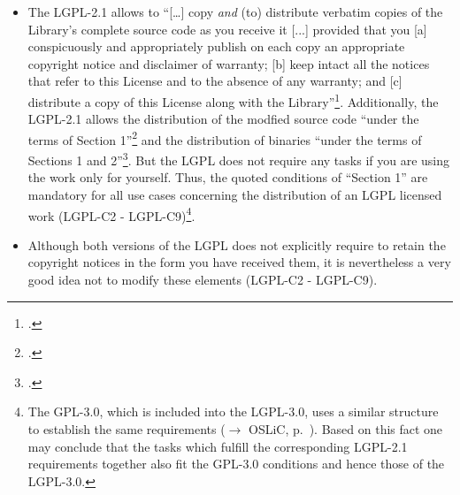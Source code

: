 \begin{itemize}
  
  \item The LGPL-2.1 allows to \enquote{[\ldots] copy \emph{and} (to)
  distribute verbatim copies of the Library's complete source code as you
  receive it [...] provided that you [a] conspicuously and appropriately publish
  on each copy an appropriate copyright notice and disclaimer of warranty; [b]
  keep intact all the notices that refer to this License and to the absence of
  any warranty; and [c] distribute a copy of this License along with the
  Library}\footcite[cf.][\nopage wp.\ §1, emphasizes by
  KR]{Lgpl21OsiLicense1999a}. Additionally, the LGPL-2.1 allows the distribution
  of the modfied source code \enquote{under the terms of Section
  1}\footcite[cf.][\nopage wp.\ §2]{Lgpl21OsiLicense1999a} and the distribution
  of binaries \enquote{under the terms of Sections 1 and
  2}\footcite[cf.][\nopage wp.\ §4]{Lgpl21OsiLicense1999a}. But the LGPL does
  not require any tasks if you are using the work only for yourself. Thus, the
  quoted conditions of \enquote{Section 1} are mandatory for all use cases
  concerning the distribution of an LGPL licensed work (LGPL-C2 -
  LGPL-C9)\footnote{The GPL-3.0, which is included into the LGPL-3.0, uses a
  similar structure to establish the same requirements ($\rightarrow$ OSLiC, p.\
  \pageref{Gpl3ConditionsDistri}). Based on this fact one may conclude that the
  tasks which fulfill the corresponding LGPL-2.1 requirements together also fit
  the GPL-3.0 conditions and hence those of the LGPL-3.0.}.

  \item Although both versions of the LGPL does not explicitly require to retain
  the copyright notices in the form you have received them, it is nevertheless a
  very good idea not to modify these elements (LGPL-C2 - LGPL-C9).
  

\end{itemize}
